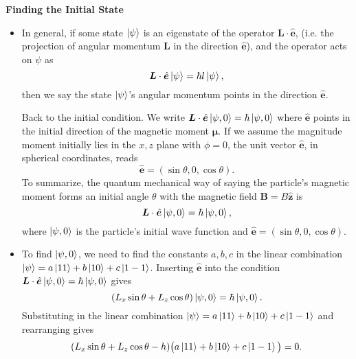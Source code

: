 \documentclass[11pt, a4paper]{article}
\renewcommand{\vec}[1]{\bm{#1}} %
\newcommand{\uvec}[1]{\hat{\vec{#1}}} %
\newcommand{\m}{\vec{\mu}}  %
\begin{document}
\textbf{Finding the Initial State}
\begin{itemize}	
	\item In general, if some state $ \ket{\psi} $ is an eigenstate of the operator $ \vec{L}\cdot \uvec{e} $, (i.e. the projection of angular momentum $ \vec{L} $ in the direction $ \uvec{e} $), and the operator acts on $ \psi $ as 
	\begin{equation*}
		\vec{L}\cdot \uvec{e} \ket{\psi} = \hbar l \ket{\psi},
	\end{equation*}
 	then we say the state $ \ket{\psi} $'s angular momentum points in the direction $ \uvec{e} $.
	
	Back to the initial condition. We write $ \vec{L}\cdot\uvec{e} \ket{\psi, 0} = \hbar \ket{\psi, 0} $ where $ \uvec{e} $ points in the initial direction of the magnetic moment $ \m $. If we assume the magnitude moment initially lies in the $ x, z $ plane with $ \phi = 0 $, the unit vector $ \uvec{e} $, in spherical coordinates, reads
	\begin{equation*}
		\uvec{e} = (\sin \theta, 0, \cos \theta).
	\end{equation*}
	To summarize, the quantum mechanical way of saying the particle's magnetic moment forms an initial angle $ \theta $ with the magnetic field $ \vec{B} = B \uvec{z} $ is
	\begin{equation*}
		\vec{L}\cdot\uvec{e} \ket{\psi, 0} = \hbar \ket{\psi, 0},
	\end{equation*}
	where $ \ket{\psi, 0} $ is the particle's initial wave function and $ \uvec{e} = (\sin \theta, 0, \cos \theta) $. 
	
	\item To find $ \ket{\psi, 0} $, we need to find the constants $ a, b, c $ in the linear combination $ \ket{\psi} = a \ket{11} + b \ket{10} + c \ket{1 -1} $. Inserting $ \uvec{e} $ into the condition $ \vec{L}\cdot\uvec{e} \ket{\psi, 0} = \hbar \ket{\psi, 0} $ gives
	\begin{equation*}
		(L_{x}\sin \theta + L_{z}\cos \theta)\ket{\psi, 0} = \hbar \ket{\psi, 0}.
	\end{equation*}
	Substituting in the linear combination $ \ket{\psi} = a \ket{11} + b \ket{10} + c \ket{1 -1} $ and rearranging gives
	\begin{equation*}
		(L_{x}\sin \theta + L_{z}\cos \theta - h)\big(a \ket{11} + b\ket{10} + c\ket{1-1}\big) = 0.
	\end{equation*}
	
\end{itemize}
\end{document}
